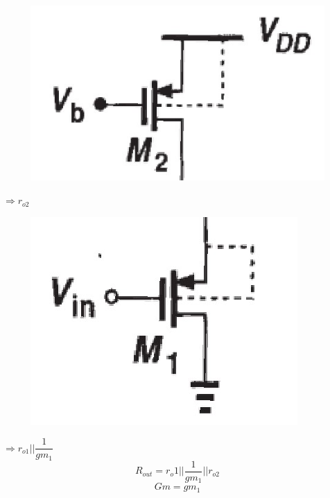 \documentclass{beamer}
\begin{document}
\begin{frame}
\begin{minipage}{0.45\linewidth}
    \end{minipage}
    \begin{minipage}{0.535\linewidth}
        \begin{minipage}{0.5\linewidth}
            \begin{figure}[H]
                \includegraphics[width=0.8\linewidth]{Rin25}
            \end{figure}
        \end{minipage}
        $\Rightarrow r_{o2}$\\
        \begin{minipage}{0.45\linewidth}
            \begin{figure}[H]
                \includegraphics[width=0.8\linewidth]{Rout1}
            \end{figure}
        \end{minipage}
        $\Rightarrow r_{o1}||\dfrac{1}{gm_1}$\\
        \begin{equation*}
            R_{out} = r_o1||\frac{1}{gm_1}||r_{o2}
        \end{equation*}
        \begin{equation*}
            Gm = gm_1
        \end{equation*}
    \end{minipage}
\end{frame}
\end{document}

